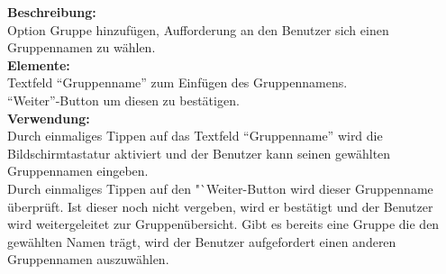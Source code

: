 \textbf{Beschreibung:}\\
Option Gruppe hinzufügen, Aufforderung an den Benutzer sich einen Gruppennamen zu wählen.\\
\textbf{Elemente:}\\
Textfeld "`Gruppenname"' zum Einfügen des Gruppennamens.\\
"`Weiter"'-Button um diesen zu bestätigen.\\
\textbf{Verwendung:}\\
Durch einmaliges Tippen auf das Textfeld "`Gruppenname"' wird die Bildschirmtastatur aktiviert und der Benutzer kann seinen gewählten Gruppennamen eingeben.\\
Durch einmaliges Tippen auf den "`Weiter\grqq-Button wird dieser Gruppenname überprüft. Ist dieser noch nicht vergeben, wird er bestätigt und der Benutzer wird weitergeleitet zur Gruppenübersicht. Gibt es bereits eine Gruppe die den gewählten Namen trägt, wird der Benutzer aufgefordert einen anderen Gruppennamen auszuwählen.
\clearpage
\newpage

